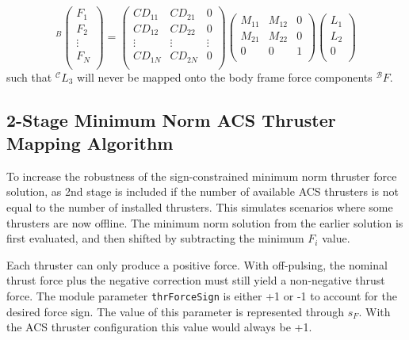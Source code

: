 \begin{equation}
{}^{B}\begin{pmatrix}
 F_1 \\
 F_2 \\
 \vdots \\
 F_N \\
\end{pmatrix} =
\begin{pmatrix}
CD_{11} & CD_{21} & 0 \\
CD_{12} & CD_{22} & 0 \\
\vdots  & \vdots  & \vdots \\
CD_{1N} & CD_{2N} & 0\\
\end{pmatrix}
\begin{pmatrix}
M_{11} & M_{12} & 0 \\
M_{21} & M_{22} & 0 \\
0 & 0 & 1 \\
\end{pmatrix} 
\begin{pmatrix}
 L_1 \\
 L_2 \\
 0 \\
\end{pmatrix} 
\end{equation}
such that ${}^{\mathcal{C}}L_3$ will never be mapped onto the body frame force components ${}^{\mathcal{B}}F$.


\subsection{2-Stage Minimum Norm ACS Thruster Mapping Algorithm}
To increase the robustness of the sign-constrained minimum norm thruster force solution, as 2nd stage is included if the number of available ACS thrusters is not equal to the number of installed thrusters.  This simulates scenarios where some thrusters are now offline.    The minimum norm solution from the earlier solution is first evaluated, and then shifted by subtracting the minimum $F_{i}$ value.  

Each thruster can only produce a positive force.  With off-pulsing, the nominal thrust force plus the negative correction must still yield a non-negative thrust force.  The module parameter {\tt thrForceSign} is either +1 or -1 to account for the desired force sign.  The value of this parameter is represented through $s_{F}$.  With the ACS thruster configuration this value would always be +1.  

